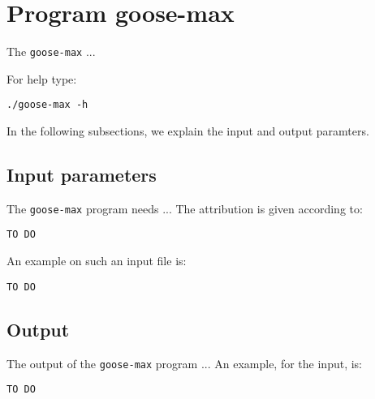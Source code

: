 \section{Program goose-max}
The \texttt{goose-max} ...

For help type:
\begin{lstlisting}
./goose-max -h
\end{lstlisting}
In the following subsections, we explain the input and output paramters.

\subsection{Input parameters}

The \texttt{goose-max} program needs ...
The attribution is given according to:
\begin{lstlisting}
TO DO
\end{lstlisting}

An example on such an input file is:
\begin{lstlisting}
TO DO
\end{lstlisting}

\subsection{Output}
The output of the \texttt{goose-max} program ...
An example, for the input, is:
\begin{lstlisting}
TO DO
\end{lstlisting}